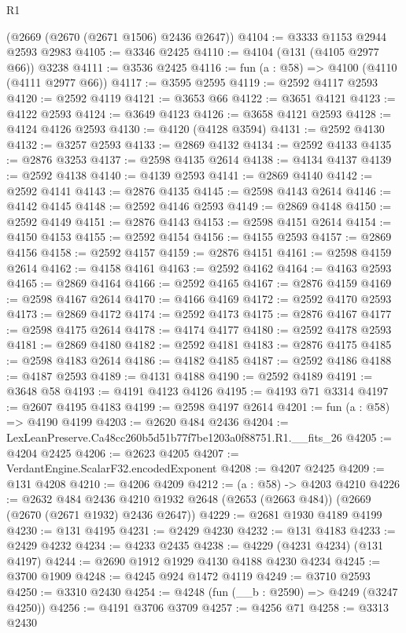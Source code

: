 \begin{lexlean}{R1}
\begin{coremodule}
    (@2669 (@2670 (@2671 @1506) @2436 @2647))
@4104 := @3333 @1153 @2944 @2593 @2983
@4105 := @3346 @2425
@4110 := @4104 (@131 (@4105 @2977 @66)) @3238
@4111 := @3536 @2425
@4116 := fun (a : @58) => @4100 (@4110 (@4111 @2977 @66))
@4117 := @3595 @2595
@4119 := @2592 @4117 @2593
@4120 := @2592 @4119
@4121 := @3653 @66
@4122 := @3651 @4121
@4123 := @4122 @2593
@4124 := @3649 @4123
@4126 := @3658 @4121 @2593
@4128 := @4124 @4126 @2593
@4130 := @4120 (@4128 @3594)
@4131 := @2592 @4130
@4132 := @3257 @2593
@4133 := @2869 @4132
@4134 := @2592 @4133
@4135 := @2876 @3253
@4137 := @2598 @4135 @2614
@4138 := @4134 @4137
@4139 := @2592 @4138
@4140 := @4139 @2593
@4141 := @2869 @4140
@4142 := @2592 @4141
@4143 := @2876 @4135
@4145 := @2598 @4143 @2614
@4146 := @4142 @4145
@4148 := @2592 @4146 @2593
@4149 := @2869 @4148
@4150 := @2592 @4149
@4151 := @2876 @4143
@4153 := @2598 @4151 @2614
@4154 := @4150 @4153
@4155 := @2592 @4154
@4156 := @4155 @2593
@4157 := @2869 @4156
@4158 := @2592 @4157
@4159 := @2876 @4151
@4161 := @2598 @4159 @2614
@4162 := @4158 @4161
@4163 := @2592 @4162
@4164 := @4163 @2593
@4165 := @2869 @4164
@4166 := @2592 @4165
@4167 := @2876 @4159
@4169 := @2598 @4167 @2614
@4170 := @4166 @4169
@4172 := @2592 @4170 @2593
@4173 := @2869 @4172
@4174 := @2592 @4173
@4175 := @2876 @4167
@4177 := @2598 @4175 @2614
@4178 := @4174 @4177
@4180 := @2592 @4178 @2593
@4181 := @2869 @4180
@4182 := @2592 @4181
@4183 := @2876 @4175
@4185 := @2598 @4183 @2614
@4186 := @4182 @4185
@4187 := @2592 @4186
@4188 := @4187 @2593
@4189 := @4131 @4188
@4190 := @2592 @4189
@4191 := @3648 @58
@4193 := @4191 @4123 @4126
@4195 := @4193 @71 @3314
@4197 := @2607 @4195 @4183
@4199 := @2598 @4197 @2614
@4201 := fun (a : @58) => @4190 @4199
@4203 := @2620 @484 @2436
@4204 := LexLeanPreserve.Ca48cc260b5d51b77f7be1203a0f88751.R1.__fits_26
@4205 := @4204 @2425
@4206 := @2623 @4205
@4207 := VerdantEngine.ScalarF32.encodedExponent
@4208 := @4207 @2425
@4209 := @131 @4208
@4210 := @4206 @4209
@4212 := (a : @58) -> @4203 @4210
@4226 := @2632
    @484
    @2436
    @4210
    @1932
    @2648
    (@2653 (@2663 @484))
    (@2669 (@2670 (@2671 @1932) @2436 @2647))
@4229 := @2681 @1930 @4189 @4199
@4230 := @131 @4195
@4231 := @2429 @4230
@4232 := @131 @4183
@4233 := @2429 @4232
@4234 := @4233 @2435
@4238 := @4229 (@4231 @4234) (@131 @4197)
@4244 := @2690 @1912 @1929 @4130 @4188 @4230 @4234
@4245 := @3700 @1909
@4248 := @4245 @924 @1472 @4119
@4249 := @3710 @2593
@4250 := @3310 @2430
@4254 := @4248 (fun (__b : @2590) => @4249 (@3247 @4250))
@4256 := @4191 @3706 @3709
@4257 := @4256 @71
@4258 := @3313 @2430

\end{coremodule}
\end{lexlean}
